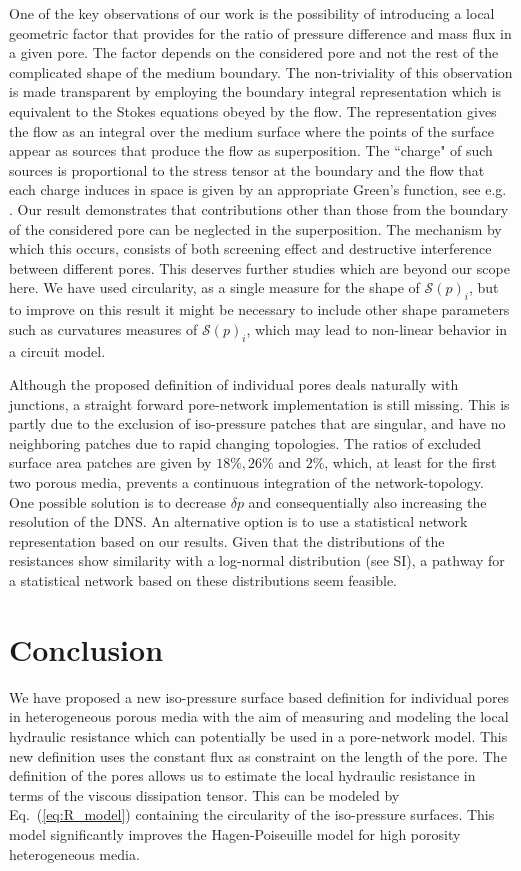 \documentclass[draft]{agujournal2019}
\begin{document}
One of the key observations of our work is the possibility of introducing a local geometric factor that provides for the ratio of pressure difference and mass flux in a given pore. The factor depends on the considered pore and not the rest of the complicated shape of the medium boundary. The non-triviality of this observation is made transparent by employing the boundary integral representation which is equivalent to the Stokes equations obeyed by the flow. The representation gives the flow as an integral over the medium surface where the points of the surface appear as sources that produce the flow as superposition. The ``charge" of such sources is proportional to the stress tensor at the boundary and the flow that each charge induces in space is given by an appropriate Green's function, see e.g. \cite{pozrikidis_boundary_1992}. Our result demonstrates that contributions other than those from the boundary of the considered pore can be neglected in the superposition. The mechanism by which this occurs, consists of both screening effect and destructive interference between different pores. This deserves further studies which are beyond our scope here. We have used circularity, as a single measure for the shape of $\mathcal{S}(p)_i$, but to improve on this result it might be necessary to include other shape parameters such as curvatures measures of $\mathcal{S}(p)_i$, which may lead to non-linear behavior in a circuit model. 

Although the proposed definition of individual pores deals naturally with junctions, a straight forward pore-network implementation is still missing. This is partly due to the exclusion of iso-pressure patches that are singular, and have no neighboring patches due to rapid changing topologies. The ratios of excluded surface area patches are given by $18 \%, 26 \%$ and $2\%$, which, at least for the first two porous media, prevents a continuous integration of the network-topology. One possible solution is to decrease $\delta p$ and consequentially also increasing the resolution of the DNS. An alternative option is to use a statistical network representation based on our results. Given that the distributions of the resistances show similarity with a log-normal distribution (see SI), a pathway for a statistical network based on these distributions seem feasible. 

\section{Conclusion}
We have proposed a new iso-pressure surface based definition for individual pores in heterogeneous porous media with the aim of measuring and modeling the local hydraulic resistance which can potentially be used in a pore-network model. This new definition uses the constant flux as constraint on the length of the pore. The definition of the pores allows us to estimate the local hydraulic resistance in terms of the viscous dissipation tensor. This can be modeled by Eq.~(\ref{eq:R_model}) containing the circularity of the iso-pressure surfaces. This model significantly improves the Hagen-Poiseuille model for high porosity heterogeneous media. 







\end{document}
